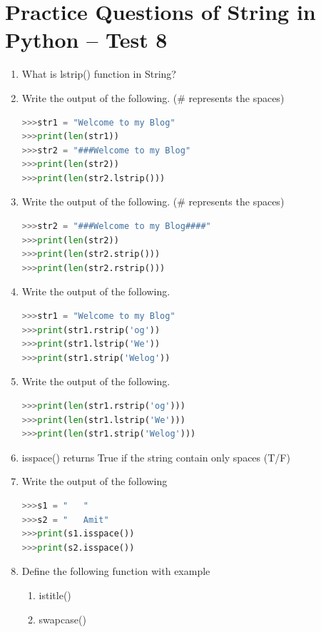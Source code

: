 \documentclass[12pt,a4paper]{article}
\begin{document}
\section{Practice Questions of String in Python -- Test 8}

\begin{enumerate}[label=\textbf{Q\arabic*.}]

\item What is lstrip() function in String?

\item Write the output of the following. (\# represents the spaces)
\begin{lstlisting}[language=Python]
>>>str1 = "Welcome to my Blog"
>>>print(len(str1))
>>>str2 = "###Welcome to my Blog"
>>>print(len(str2))
>>>print(len(str2.lstrip()))
\end{lstlisting}

\item Write the output of the following. (\# represents the spaces)
\begin{lstlisting}[language=Python]
>>>str2 = "###Welcome to my Blog####"
>>>print(len(str2))
>>>print(len(str2.strip()))
>>>print(len(str2.rstrip()))
\end{lstlisting}

\item Write the output of the following.
\begin{lstlisting}[language=Python]
>>>str1 = "Welcome to my Blog"
>>>print(str1.rstrip('og'))
>>>print(str1.lstrip('We'))
>>>print(str1.strip('Welog'))
\end{lstlisting}

\item Write the output of the following.
\begin{lstlisting}[language=Python]
>>>print(len(str1.rstrip('og')))
>>>print(len(str1.lstrip('We')))
>>>print(len(str1.strip('Welog')))
\end{lstlisting}

\item isspace() returns True if the string contain only spaces (T/F)

\item Write the output of the following
\begin{lstlisting}[language=Python]
>>>s1 = "   "
>>>s2 = "   Amit"
>>>print(s1.isspace())
>>>print(s2.isspace())
\end{lstlisting}

\item Define the following function with example
\begin{enumerate}[label=\alph*.]
\item istitle()
\item swapcase()
\end{enumerate}

\end{enumerate}
\end{document}
